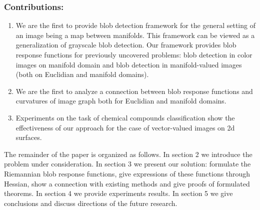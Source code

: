 \documentclass{llncs}
\begin{document}
\subsubsection{Contributions:}
\begin{enumerate}
\item We are the first to provide blob detection framework for the general setting of an image being a map between manifolds. This framework can be viewed as a generalization of grayscale blob detection. Our framework provides blob response functions for previously uncovered problems: blob detection in color images on manifold domain and blob detection in manifold-valued images (both on Euclidian and manifold domains). 
\item We are the first to analyze a connection between blob response functions and curvatures of image graph both for Euclidian and manifold domains.
\item Experiments on the task of chemical compounds classification show the effectiveness of our approach for the case of vector-valued images on 2d surfaces.  
\end{enumerate}

The remainder of the paper is organized as follows. In section 2 we introduce the problem under consideration. In section 3 we present our solution: formulate the Riemannian blob response functions, give expressions of these functions through Hessian, show a connection with existing methods and give proofs of formulated theorems. In section 4 we provide experiments results. In section 5 we give conclusions and discuss directions of the future research.
\end{document}
